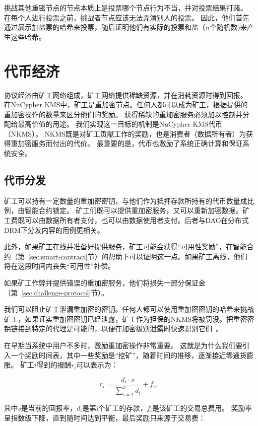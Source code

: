 \documentclass[longbibliography,nofootinbib]{revtex4-1}
\newcommand{\kms}{NuCypher KMS}
\begin{document}
    挑战其他重密节点的节点本质上是投票哪个节点行为不当，并对投票结果打赌。 在每个人进行投票之前，挑战者节点应该无法弄清别人的投票。 因此，他们首先通过展示加盐票的哈希来投票，随后证明他们有实际的投票和盐（$n$个随机数)来产生这些哈希。

\section{代币经济}
\label{sec:token}

协议经济由矿工网络组成，矿工网络提供稀缺资源，并在消耗资源时得到回报。 在\kms 中，矿工是重加密节点。任何人都可以成为矿工，根据提供的重加密操作的数量来区分他们的奖励。 获得稀缺的重加密服务必须加以控制并分配给最高价值的用途。 我们实现这一目标的机制是\kms 代币（NKMS）。 NKMS既是对矿工贡献工作的奖励，也是消费者（数据所有者）为获得重加密服务而付出的代价。 最重要的是，代币也激励了系统正确计算和保证系统安全。

\subsection{代币分发}

	矿工可以持有一定数量的重加密密钥，与他们作为抵押存款所持有的代币数量成比例，由智能合约锁定。 矿工们既可以提供重加密服务，又可以重新加密数据。矿工费既可以由数据所有者支付，也可以由数据使用者支付。后者与DAO在分布式DRM下分发内容的用例更相关。
    
	此外，如果矿工在线并准备好提供服务，矿工可能会获得“可用性奖励”，在智能合约（第~\ref{sec:smart-contract}节）的帮助下可以证明这一点。如果矿工离线，他们将在这段时间内丧失“可用性”补偿。
    
	如果矿工作弊并提供错误的重加密服务，他们将损失一部分保证金（第~\ref{sec:challenge-protocol}节）。
    
    我们可以阻止矿工泄漏重加密的密钥。任何人都可以使用重加密密钥的哈希来挑战矿工，如果证实重加密密钥已经泄露，矿工作为担保的NKMS将被罚没。把重密密钥链接到特定的代理是可能的，以便在加密级别泄露时快速识别它们~\cite{Libert2008}。
    
    在早期当系统中用户不多时，激励重加密操作非常重要。 这就是为什么我们要引入一个奖励时间表，其中一些奖励是“挖矿”，随着时间的推移，逐渐接近零通货膨胀。 矿工$i$得到的报酬$r_i$可以表示为：
    
\begin{equation}
    r_i = \frac{d_i \cdot s}{\sum_{i=1}^k d_i} + f_i,
\end{equation}

	其中$s$是当前的回报率，$d_i$是第i个矿工的存款，$f_i$是该矿工的交易总费用。 奖励率呈指数级下降，直到随时间达到平衡，最后奖励只来源于交易费：
    
\end{document}
